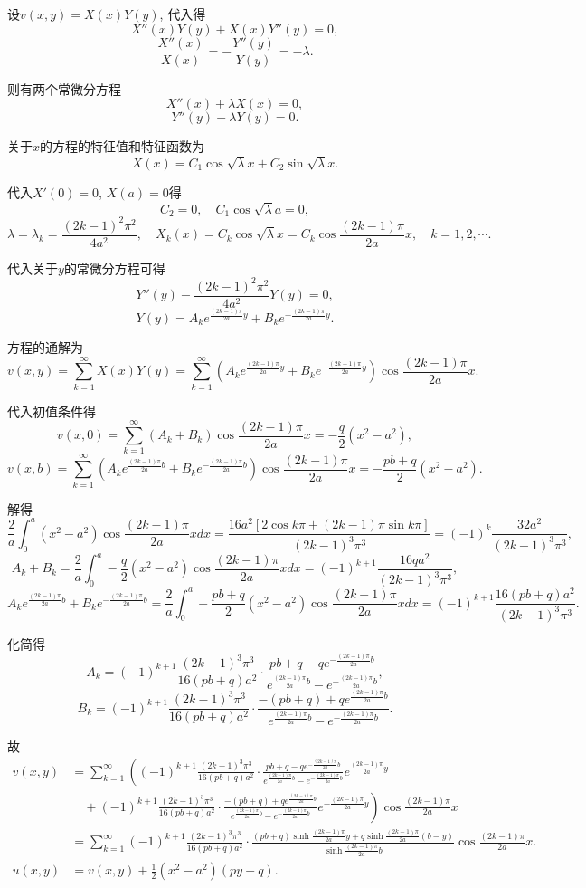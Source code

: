 \documentclass[11pt,a4paper]{article}
\begin{document}
设$v(x,y)=X(x)Y(y)$, 代入得
$$X''(x)Y(y)+X(x)Y''(y)=0,$$
$$\frac{X''(x)}{X(x)}=-\frac{Y''(y)}{Y(y)}=-\lambda.$$

则有两个常微分方程
$$X''(x)+\lambda X(x)=0,$$
$$Y''(y)-\lambda Y(y)=0.$$

关于$x$的方程的特征值和特征函数为
$$X(x)=C_1\cos\sqrt{\lambda}x+C_2\sin\sqrt{\lambda}x.$$

代入$X'(0)=0$, $X(a)=0$得
$$C_2=0,\quad C_1\cos\sqrt{\lambda}a=0,$$
$$\lambda=\lambda_k=\frac{(2k-1)^2\pi^2}{4a^2},\quad X_k(x)=C_k\cos\sqrt{\lambda}x=C_k\cos\frac{(2k-1)\pi}{2a}x,\quad k=1,2,\cdots.$$

代入关于$y$的常微分方程可得
$$Y''(y)-\frac{(2k-1)^2\pi^2}{4a^2} Y(y)=0,$$
$$Y(y)=A_ke^{\frac{(2k-1)\pi}{2a}y}+B_ke^{-\frac{(2k-1)\pi}{2a}y}.$$

方程的通解为
$$v(x,y)=\sum_{k=1}^\infty X(x)Y(y)=\sum_{k=1}^\infty\left(A_ke^{\frac{(2k-1)\pi}{2a}y}+B_ke^{-\frac{(2k-1)\pi}{2a}y}\right)\cos\frac{(2k-1)\pi}{2a}x.$$

代入初值条件得
$$v(x,0)=\sum_{k=1}^\infty(A_k+B_k)\cos\frac{(2k-1)\pi}{2a}x=-\frac{q}{2}(x^2-a^2),$$
$$v(x,b)=\sum_{k=1}^\infty\left(A_ke^{\frac{(2k-1)\pi}{2a}b}+B_ke^{-\frac{(2k-1)\pi}{2a}b}\right)\cos\frac{(2k-1)\pi}{2a}x=-\frac{pb+q}{2}(x^2-a^2).$$

解得
$$\frac{2}{a}\int_0^a(x^2-a^2)\cos\frac{(2k-1)\pi}{2a}xdx=\frac{16a^2[2\cos k\pi+(2k-1)\pi\sin k\pi]}{(2k-1)^3\pi^3}=(-1)^k\frac{32a^2}{(2k-1)^3\pi^3},$$
$$A_k+B_k=\frac{2}{a}\int_0^a-\frac{q}{2}(x^2-a^2)\cos\frac{(2k-1)\pi}{2a}xdx=(-1)^{k+1}\frac{16qa^2}{(2k-1)^3\pi^3},$$
$$A_ke^{\frac{(2k-1)\pi}{2a}b}+B_ke^{-\frac{(2k-1)\pi}{2a}b}=\frac{2}{a}\int_0^a-\frac{pb+q}{2}(x^2-a^2)\cos\frac{(2k-1)\pi}{2a}xdx=(-1)^{k+1}\frac{16(pb+q)a^2}{(2k-1)^3\pi^3}.$$

化简得
$$A_k=(-1)^{k+1}\frac{(2k-1)^3\pi^3}{16(pb+q)a^2}\cdot\frac{pb+q-qe^{-\frac{(2k-1)\pi}{2a}b}}{e^{\frac{(2k-1)\pi}{2a}b}-e^{-\frac{(2k-1)\pi}{2a}b}},$$
$$B_k=(-1)^{k+1}\frac{(2k-1)^3\pi^3}{16(pb+q)a^2}\cdot\frac{-(pb+q)+qe^{\frac{(2k-1)\pi}{2a}b}}{e^{\frac{(2k-1)\pi}{2a}b}-e^{-\frac{(2k-1)\pi}{2a}b}}.$$

故
\begin{align*}
  v(x,y)
   & =\sum_{k=1}^\infty\left((-1)^{k+1}\frac{(2k-1)^3\pi^3}{16(pb+q)a^2}\cdot\frac{pb+q-qe^{-\frac{(2k-1)\pi}{2a}b}}{e^{\frac{(2k-1)\pi}{2a}b}-e^{-\frac{(2k-1)\pi}{2a}b}}e^{\frac{(2k-1)\pi}{2a}y}\right.                  \\
   & \quad +\left.(-1)^{k+1}\frac{(2k-1)^3\pi^3}{16(pb+q)a^2}\cdot\frac{-(pb+q)+qe^{\frac{(2k-1)\pi}{2a}b}}{e^{\frac{(2k-1)\pi}{2a}b}-e^{-\frac{(2k-1)\pi}{2a}b}}e^{-\frac{(2k-1)\pi}{2a}y}\right)\cos\frac{(2k-1)\pi}{2a}x \\
   & =\sum_{k=1}^\infty(-1)^{k+1}\frac{(2k-1)^3\pi^3}{16(pb+q)a^2}\cdot\frac{(pb+q)\sinh\frac{(2k-1)\pi}{2a}y+q\sinh\frac{(2k-1)\pi}{2a}(b-y)}{\sinh\frac{(2k-1)\pi}{2a}b}\cos\frac{(2k-1)\pi}{2a}x.                        \\
  u(x,y)
   & =v(x,y)+\frac{1}{2}(x^2-a^2)(py+q).
\end{align*}
\end{document}
